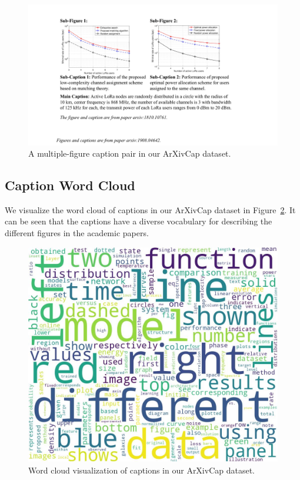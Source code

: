 \begin{figure}[t!]
    \centering
    \includegraphics[width=0.85\linewidth]{figs/multiple-figure-v2.pdf}
    \caption{A multiple-figure caption pair in our ArXivCap dataset.}
    \label{fig:multi_figure_case}
\end{figure}

\subsection{Caption Word Cloud}
\label{apx:caption_word_cloud}

We visualize the word cloud of captions in our ArXivCap dataset in Figure~\ref{fig:word_cloud}. It can be seen that the captions have a diverse vocabulary for describing the different figures in the academic papers.
\begin{figure}[t!]
    \centering
    \includegraphics[width=\linewidth]{figs/word_cloud.jpg}
    \caption{Word cloud visualization of captions in our ArXivCap dataset.}
    \label{fig:word_cloud}
\end{figure}




